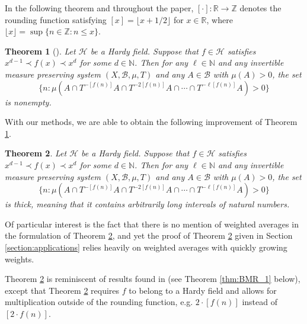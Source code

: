 \documentclass[12pt]{article}
\theoremstyle{plain} %
\newtheorem{theorem}{Theorem}[section]
\theoremstyle{definition} %
\theoremstyle{plain}
\theoremstyle{plain}
\numberwithin{equation}{section}
\newcommand{\N}{\mathbb{N}}
\newcommand{\Z}{\mathbb{Z}}
\newcommand{\R}{\mathbb{R}}
\renewcommand{\leq}{\leqslant}
\newcommand{\1}{\mathbbm{1}}
\newcommand{\floor}[1]{\lfloor #1 \rfloor}
\newcommand{\round}[1]{[ #1 ]}
\begin{document}
In the following theorem and throughout the paper, $[\cdot ]:\R\rightarrow\Z$ denotes the {rounding function} satisfying $[x] = \floor{x+1/2}$ for $x\in \R$, where $\floor{x} = \sup\{n\in \Z: n\leq x\}$.

\begin{theorem}[{\cite[Theorem 6.1]{FW09}}]\label{thm:Hardy_szemeredi}
    Let $\mathcal{H}$ be a Hardy field. Suppose that $f\in \mathcal{H}$ satisfies $x^{d-1}\prec f(x)\prec x^{d}$ for some $d\in \N$. Then for any $\ell\in \N$ and any invertible measure preserving system $(X,\mathscr{B},\mu,T)$ and any $A\in \mathscr{B}$ with $\mu(A)>0$, the set 
\begin{equation}\label{eq:Hardy_sz_returns_1}
   \{n:\mu(A\cap T^{-[ f(n)]}A\cap T^{-2[ f(n)]}A\cap \cdots\cap T^{-\ell[ f(n)]}A )>0\}
\end{equation}
is nonempty.
\end{theorem}

With our methods, we are able to obtain the following improvement of Theorem \ref{thm:Hardy_szemeredi}.

\begin{theorem}\label{thm:thick_szemeredi}
    Let $\mathcal{H}$ be a Hardy field. Suppose that $f\in \mathcal{H}$ satisfies $x^{d-1}\prec f(x)\prec x^{d}$ for some $d\in \N$. Then for any $\ell\in \N$ and any invertible measure preserving system $(X,\mathscr{B},\mu,T)$ and any $A\in \mathscr{B}$ with $\mu(A)>0$, the set 
\begin{equation}\label{eq:Hardy_sz_returns}
   \{n:\mu(A\cap T^{-[ f(n)]}A\cap T^{-2[ f(n)]}A\cap \cdots\cap T^{-\ell[ f(n)]}A )>0\}
\end{equation}
is thick, meaning that it contains arbitrarily long intervals of natural numbers.
\end{theorem}


Of particular interest is the fact that there is no mention of weighted averages in the formulation of Theorem \ref{thm:thick_szemeredi}, and yet the proof of Theorem \ref{thm:thick_szemeredi} given in Section \ref{section:applications} relies heavily on weighted averages with quickly growing weights. 

Theorem \ref{thm:thick_szemeredi} is reminiscent of results found in \cite{Bergelson_Moreira_Richter_2020} (see Theorem \ref{thm:BMR_1} below), except that Theorem \ref{thm:thick_szemeredi} requires $f$ to belong to a Hardy field and allows for multiplication outside of the rounding function, e.g. $2\cdot \round{f(n)}$ instead of $\round{2\cdot f(n)}$.
\end{document}
